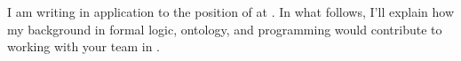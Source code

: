 I am writing in application to the position of \position{} at \companyname{}. In what follows, I'll explain how my background in formal logic, ontology, and programming would contribute to working with your team in \city{}. 